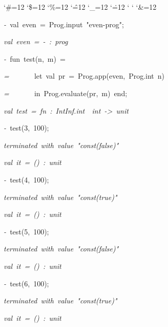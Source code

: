 \begin{list}{}
{\setlength{\leftmargin}{\leftmargini}
\setlength{\rightmargin}{0cm}
\setlength{\itemindent}{0cm}
\setlength{\listparindent}{0cm}
\setlength{\itemsep}{0cm}
\setlength{\parsep}{0cm}
\setlength{\labelsep}{0cm}
\setlength{\labelwidth}{0cm}
\catcode`\#=12
\catcode`\$=12
\catcode`\%=12
\catcode`\^=12
\catcode`\_=12
\catcode`\.=12
\catcode`
\catcode`
\catcode`\&=12
\ttfamily}
\small
\item[]\textsl{-\ }val\ even\ =\ Prog.input\ "even-prog";
\item[]\textsl{val\ even\ =\ -\ :\ prog}
\item[]\textsl{-\ }fun\ test(n,\ m)\ =
\item[]\textsl{=\ }\ \ \ \ \ \ let\ val\ pr\ =\ Prog.app(even,\ Prog.int\ n)
\item[]\textsl{=\ }\ \ \ \ \ \ in\ Prog.evaluate(pr,\ m)\ end;
\item[]\textsl{val\ test\ =\ fn\ :\ IntInf.int\ \ int\ ->\ unit}
\item[]\textsl{-\ }test(3,\ 100);
\item[]\textsl{terminated\ with\ value\ "const(false)"}
\item[]\textsl{val\ it\ =\ ()\ :\ unit}
\item[]\textsl{-\ }test(4,\ 100);
\item[]\textsl{terminated\ with\ value\ "const(true)"}
\item[]\textsl{val\ it\ =\ ()\ :\ unit}
\item[]\textsl{-\ }test(5,\ 100);
\item[]\textsl{terminated\ with\ value\ "const(false)"}
\item[]\textsl{val\ it\ =\ ()\ :\ unit}
\item[]\textsl{-\ }test(6,\ 100);
\item[]\textsl{terminated\ with\ value\ "const(true)"}
\item[]\textsl{val\ it\ =\ ()\ :\ unit}
\end{list}

